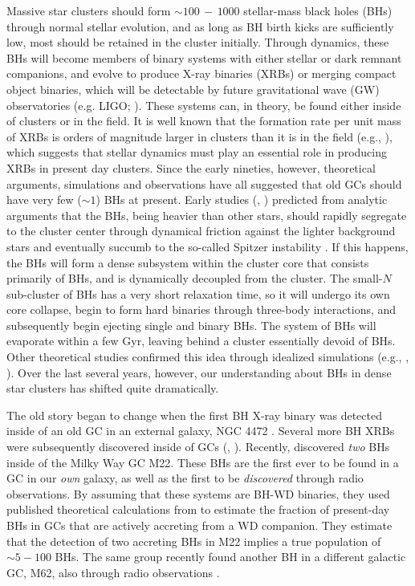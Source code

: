 \documentclass[12pt,preprint]{aastex}
\begin{document}
Massive star clusters should form $\sim 100\, -\, 1000$ stellar-mass black holes (BHs) 
through normal stellar evolution, and as long as BH birth kicks are sufficiently low, most
should be retained in the cluster initially. Through dynamics, these BHs will become 
members of binary systems with either 
stellar or dark remnant companions, and evolve to produce X-ray binaries (XRBs) or 
merging compact object binaries, which will be detectable by future gravitational wave 
(GW) observatories (e.g. LIGO; \citealt{HarryLIGO2010}). These systems can, in theory, 
be found either inside of clusters or in the field. It is well known that the formation rate 
per unit mass of XRBs is orders of magnitude larger in clusters than it is in the field
(e.g., \citealt{Pooley2003}), which suggests that stellar dynamics must play an essential
role in producing XRBs in present day clusters. Since the early nineties, however,  
theoretical arguments, simulations and observations have all suggested that old GCs 
should have very few ($\sim1$) BHs at present. Early studies (\citealt{Kulkarni1993}, 
\citealt{Sigurdsson1993}) predicted from analytic arguments that the BHs, being heavier
than other stars, should rapidly segregate to the cluster center through dynamical friction
against the lighter background stars and eventually succumb to the so-called Spitzer
instability \citep{Spitzer1969, Kulkarni1993}. If this happens, the BHs will form a dense 
subsystem within the cluster core that consists primarily of BHs, and is dynamically 
decoupled from the cluster. The small-$N$ sub-cluster of BHs has a very short relaxation 
time, so it will undergo its own core collapse, begin to form hard binaries through three-body 
interactions, and subsequently begin ejecting single and binary BHs. The system of BHs 
will evaporate within a few Gyr, leaving behind a cluster essentially devoid of 
BHs. Other theoretical studies confirmed this idea through idealized simulations 
(e.g., \citealt{PortegiesZwart2000}, \citealt{OLeary2006}). Over the last several years, 
however, our understanding about BHs in dense star clusters has shifted quite dramatically.

The old story began to change when the first BH X-ray binary was detected inside of an 
old GC in an external galaxy, NGC 4472 \citep{MaccaroneNature2007}. Several more BH 
XRBs were subsequently discovered inside of GCs (\citealt{Barnard2011}, \citealt{Shih2010}). 
Recently, \cite{Strader2012} discovered \emph{two} BHs inside of the Milky Way GC M22. 
These BHs are the first ever to be found in a GC in our \emph{own} galaxy, as well as the first 
to be \emph{discovered} through radio observations. By assuming that these systems are 
BH-WD binaries, they used published theoretical calculations from \cite{Ivanova2010} to 
estimate the fraction of present-day BHs in GCs that are actively accreting from a WD 
companion. They estimate that the detection of two accreting BHs in M22 implies a true 
population of $\sim 5-100$ BHs.  The same group recently found another BH in a different 
galactic GC, M62, also through radio observations \citep{Chomiuk2013}. 
\end{document}
